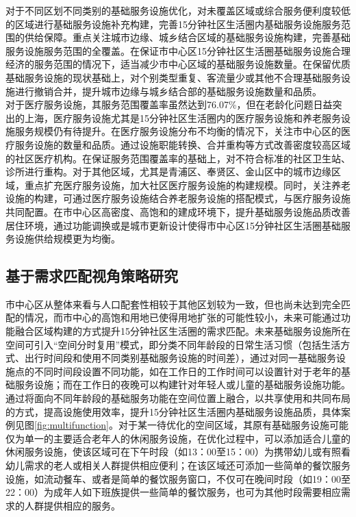 \documentclass{shnuthesis}
\begin{document}
对于不同区划不同类别的基础服务设施优化，对未覆盖区域或综合服务便利度较低的区域进行基础服务设施补充构建，完善15分钟社区生活圈内基础服务设施服务范围的供给保障。重点关注城市边缘、城乡结合区域的基础服务设施构建，完善基础服务设施服务范围的全覆盖。在保证市中心区15分钟社区生活圈基础服务设施合理经济的服务范围的情况下，适当减少市中心区域的基础服务设施数量。在保留优质基础服务设施的现状基础上，对个别类型重复、客流量少或其他不合理基础服务设施进行撤销合并，提升城市边缘与城乡结合部的基础服务设施数量和品质。\\
\indent 对于医疗服务设施，其服务范围覆盖率虽然达到76.07\%，但在老龄化问题日益突出的上海，医疗服务设施尤其是15分钟社区生活圈内的医疗服务设施和养老服务设施服务规模仍有待提升。在医疗服务设施分布不均衡的情况下，关注市中心区的医疗服务设施的数量和品质。通过设施职能转换、合并重构等方式改善密度较高区域的社区医疗机构。在保证服务范围覆盖率的基础上，对不符合标准的社区卫生站、诊所进行重构。对于其他区域，尤其是青浦区、奉贤区、金山区中的城市边缘区域，重点扩充医疗服务设施，加大社区医疗服务设施的构建规模。同时，关注养老设施的构建，可通过医疗服务设施结合养老服务设施的搭配模式，与医疗服务设施共同配置。在市中心区高密度、高饱和的建成环境下，提升基础服务设施品质改善居住环境，通过功能调换或是城市更新设计使得市中心区15分钟社区生活圈基础服务设施供给规模更为均衡。

\subsection{基于需求匹配视角策略研究}

市中心区从整体来看与人口配套性相较于其他区划较为一致，但也尚未达到完全匹配的情况，而市中心的高饱和用地已使得用地扩张的可能性较小，未来可能通过功能融合区域构建的方式提升15分钟社区生活圈的需求匹配。未来基础服务设施所在空间可引入“空间分时复用”模式，即分类不同年龄段的日常生活习惯（包括生活方式、出行时间段和使用不同类别基础服务设施的时间差），通过对同一基础服务设施点的不同时间段设置不同功能，如在工作日的工作时间可以设置针对于老年的基础服务设施；而在工作日的夜晚可以构建针对年轻人或儿童的基础服务设施功能。通过将面向不同年龄段的基础服务功能在空间位置上融合，以共享使用和共同布局的方式，提高设施使用效率，提升15分钟社区生活圈内基础服务设施品质，具体案例见图\ref{fig:multifunction}。对于某一待优化的空间区域，其原有基础服务设施可能仅为单一的主要适合老年人的休闲服务设施，在优化过程中，可以添加适合儿童的休闲服务设施，使该区域可在下午时段（如13：00至15：00）为携带幼儿或有照看幼儿需求的老人或相关人群提供相应便利；在该区域还可添加一些简单的餐饮服务设施，如流动餐车、或者是简单的餐饮服务窗口，不仅可在晚间时段（如19：00至22：00）为成年人如下班族提供一些简单的餐饮服务，也可为其他时段需要相应需求的人群提供相应的服务。
\end{document}
